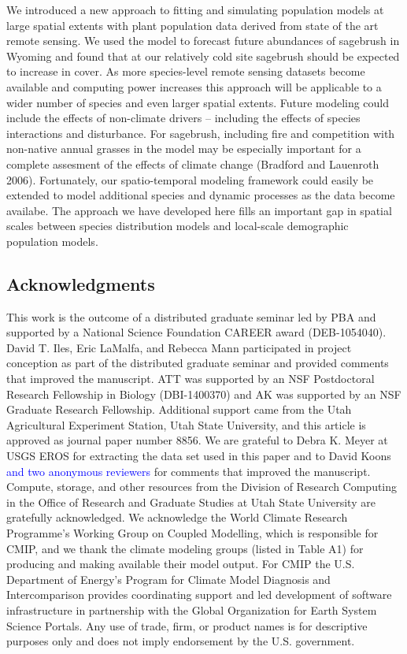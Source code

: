 \documentclass[12pt,]{article}
\begin{document}
We introduced a new approach to fitting and simulating population models
at large spatial extents with plant population data derived from state
of the art remote sensing. We used the model to forecast future
abundances of sagebrush in Wyoming and found that at our relatively cold
site sagebrush should be expected to increase in cover. As more
species-level remote sensing datasets become available and computing
power increases this approach will be applicable to a wider number of
species and even larger spatial extents. Future modeling could include
the effects of non-climate drivers -- including the effects of species
interactions and disturbance. For sagebrush, including fire and
competition with non-native annual grasses in the model may be
especially important for a complete assesment of the effects of climate
change (Bradford and Lauenroth 2006). Fortunately, our spatio-temporal
modeling framework could easily be extended to model additional species
and dynamic processes as the data become availabe. The approach we have
developed here fills an important gap in spatial scales between species
distribution models and local-scale demographic population models.

\subsection{Acknowledgments}\label{acknowledgments}

This work is the outcome of a distributed graduate seminar led by PBA
and supported by a National Science Foundation CAREER award
(DEB-1054040). David T. Iles, Eric LaMalfa, and Rebecca Mann
participated in project conception as part of the distributed graduate
seminar and provided comments that improved the manuscript. ATT was
supported by an NSF Postdoctoral Research Fellowship in Biology
(DBI-1400370) and AK was supported by an NSF Graduate Research
Fellowship. Additional support came from the Utah Agricultural
Experiment Station, Utah State University, and this article is approved
as journal paper number 8856. We are grateful to Debra K. Meyer at USGS
EROS for extracting the data set used in this paper and to David Koons
\textcolor{blue}{and two anonymous reviewers} for comments that improved
the manuscript. Compute, storage, and other resources from the Division
of Research Computing in the Office of Research and Graduate Studies at
Utah State University are gratefully acknowledged. We acknowledge the
World Climate Research Programme's Working Group on Coupled Modelling,
which is responsible for CMIP, and we thank the climate modeling groups
(listed in Table A1) for producing and making available their model
output. For CMIP the U.S. Department of Energy's Program for Climate
Model Diagnosis and Intercomparison provides coordinating support and
led development of software infrastructure in partnership with the
Global Organization for Earth System Science Portals. Any use of trade,
firm, or product names is for descriptive purposes only and does not
imply endorsement by the U.S. government.
\end{document}
